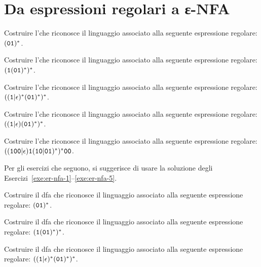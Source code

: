\section{Da espressioni regolari a ε-NFA}
\label{sec:da-ER-a-eNFA}

\begin{Exercise}\label{exe:er-nfa-1}
Costruire l'\enfa che riconosce il linguaggio associato alla seguente espressione regolare: $(\mathtt{0}\mathtt{1}){}^{\ast}$.
\end{Exercise}

\begin{Exercise}\label{exe:er-nfa-2}
Costruire l'\enfa che riconosce il linguaggio associato alla seguente espressione regolare: $(\mathtt{1}(\mathtt{0}\mathtt{1}){}^{\ast}){}^{\ast}$.
\end{Exercise}

\begin{Exercise}\label{exe:er-nfa-3}
Costruire l'\enfa che riconosce il linguaggio associato alla seguente espressione regolare: $((\mathtt{1}|\epsilon){}^{\ast}(\mathtt{0}\mathtt{1}){}^{\ast}){}^{\ast}$.
\end{Exercise}

\begin{Exercise}\label{exe:er-nfa-4}
Costruire l'\enfa che riconosce il linguaggio associato alla seguente espressione regolare: $((\mathtt{1}|\epsilon)(\mathtt{0}\mathtt{1}){}^{\ast}){}^{\ast}$.
\end{Exercise}

\begin{Exercise}\label{exe:er-nfa-5}
Costruire l'\enfa che riconosce il linguaggio associato alla seguente espressione regolare: $((\mathtt{1}\mathtt{0}\mathtt{0}|\epsilon)\mathtt{1}(\mathtt{1}\mathtt{0}|\mathtt{0}\mathtt{1}){}^{\ast}){}^{\ast}\mathtt{0}\mathtt{0}$.
\end{Exercise}

Per gli esercizi che seguono, si suggerisce di usare la soluzione degli Esercizi~\ref{exe:er-nfa-1}--\ref{exe:er-nfa-5}.


\begin{Exercise}\label{exe:er-dfa-1}
Costruire il dfa che riconosce il linguaggio associato alla seguente espressione regolare: $(\mathtt{0}\mathtt{1}){}^{\ast}$.
\end{Exercise}

\begin{Exercise}\label{exe:er-dfa-2}
Costruire il dfa che riconosce il linguaggio associato alla seguente espressione regolare: $(\mathtt{1}(\mathtt{0}\mathtt{1}){}^{\ast}){}^{\ast}$.
\end{Exercise}

\begin{Exercise}\label{exe:er-dfa-3}
Costruire il dfa che riconosce il linguaggio associato alla seguente espressione regolare: $((\mathtt{1}|\epsilon){}^{\ast}(\mathtt{0}\mathtt{1}){}^{\ast}){}^{\ast}$.
\end{Exercise}

